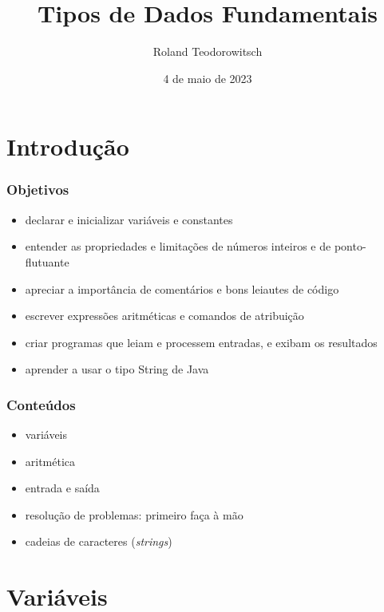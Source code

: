 \documentclass[xcolor={dvipsnames,table},aspectratio=169]{beamer}
\title[\sc{Tipos de Dados Fundamentais}]{Tipos de Dados Fundamentais}
\author[Roland Teodorowitsch]{Roland Teodorowitsch}
\institute[FPROG - EP - PUCRS]{Fundamentos de Programação - Escola Politécnica - PUCRS}
\date{4 de maio de 2023}
\begin{document}
\justifying

\begin{frame}
	\titlepage
\end{frame}

\section{Introdução}

\begin{frame}\frametitle{Objetivos}
\begin{itemize}
	\item declarar e inicializar variáveis e constantes
	\item entender as propriedades e limitações de números inteiros e de ponto-flutuante
	\item apreciar a importância de comentários e bons leiautes de código
	\item escrever expressões aritméticas e comandos de atribuição
	\item criar programas que leiam e processem entradas, e exibam os resultados
	\item aprender a usar o tipo String de Java
\end{itemize}
\end{frame}

\begin{frame}\frametitle{Conteúdos}
\begin{itemize}
	\item variáveis
	\item aritmética
	\item entrada e saída
	\item resolução de problemas: primeiro faça à mão
	\item cadeias de caracteres (\emph{strings})
\end{itemize}
\end{frame}

\section{Variáveis}
\end{document}
